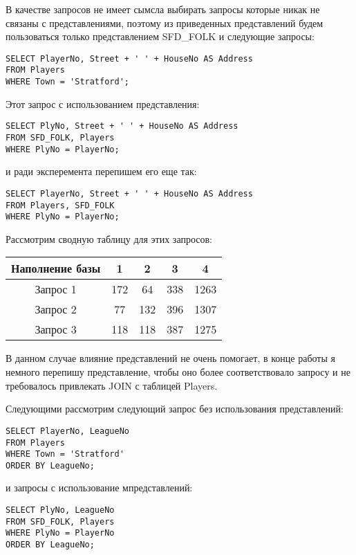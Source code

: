 \documentclass[a4paper,12pt]{article}
\begin{document}
В качестве запросов не имеет сымсла выбирать запросы которые никак не связаны с представлениями, поэтому из приведенных представлений будем пользоваться только представлением SFD\_FOLK и следующие запросы:

\begin{lstlisting}
SELECT PlayerNo, Street + ' ' + HouseNo AS Address
FROM Players
WHERE Town = 'Stratford';
\end{lstlisting}

Этот запрос с использованием представления:

\begin{lstlisting}
SELECT PlyNo, Street + ' ' + HouseNo AS Address
FROM SFD_FOLK, Players
WHERE PlyNo = PlayerNo;
\end{lstlisting}

и ради эксперемента перепишем его еще так:

\begin{lstlisting}
SELECT PlayerNo, Street + ' ' + HouseNo AS Address
FROM Players, SFD_FOLK
WHERE PlyNo = PlayerNo;
\end{lstlisting}

Рассмотрим сводную таблицу для этих запросов:

\begin{tabular}[t]{|c|c|c|c|c|}
\hline
Наполнение базы &    1 &    2 &    3 &    4 \\
\hline
Запрос 1        &  172 &   64 &  338 & 1263 \\
\hline
Запрос 2        &   77 &  132 &  396 & 1307 \\ 
\hline
Запрос 3        &  118 &  118 &  387 & 1275 \\
\hline
\end{tabular}

В данном случае влияние представлений не очень помогает, в конце работы я немного перепишу представление, чтобы оно более соответствовало запросу и не требовалось привлекать JOIN с таблицей Players.

Следующими рассмотрим следующий запрос без использования представлений:

\begin{lstlisting}
SELECT PlayerNo, LeagueNo
FROM Players
WHERE Town = 'Stratford'
ORDER BY LeagueNo;
\end{lstlisting}

и запросы с использование мпредставлений:

\begin{lstlisting}
SELECT PlyNo, LeagueNo
FROM SFD_FOLK, Players
WHERE PlyNo = PlayerNo
ORDER BY LeagueNo;
\end{lstlisting}
\end{document}
